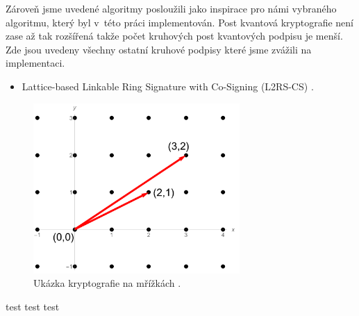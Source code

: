 \hfill

Zároveň jsme uvedené algoritmy posloužili jako inspirace pro námi vybraného algoritmu, který byl v~této práci implementován. Post kvantová kryptografie není zase až tak rozšířená takže počet kruhových post kvantových podpisu je menší. Zde jsou uvedeny všechny ostatní kruhové podpisy které jsme zvážili na implementaci.

\begin{itemize}
  \item Lattice-based Linkable Ring Signature with Co-Signing (L2RS-CS) \cite{Torres2020}.
\end{itemize}


\begin{figure}[htbp]
  \centering
  \includegraphics[width=0.7\textwidth]{img/mrizky.png}
  \caption{Ukázka kryptografie na mřížkách \cite{Mrizky picture}.}
  \label{lattice}
  \label{Ring signature}
\end{figure}

test
test
test